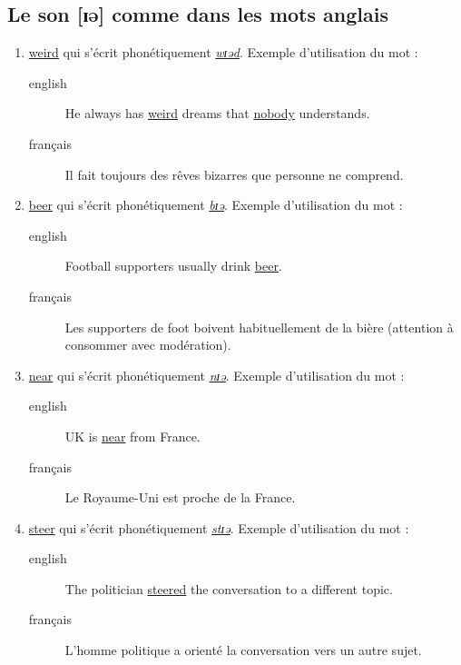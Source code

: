 \subsection{Le son [ɪə] comme dans les mots anglais}
\label{sec:org2e2326e}
\begin{enumerate}
\item \href{http://www.wordreference.com/enfr/weird}{weird} qui s'écrit phonétiquement \href{https://en.oxforddictionaries.com/definition/weird}{\emph{wɪəd}}. Exemple d'utilisation du mot :
\begin{description}
\item[{english}] \textenglish{He always has \href{https://youtu.be/fcdUXnt87ng}{weird} dreams that \href{https://youtu.be/FikYhD7bXYE}{nobody} understands.}
\item[{français}] Il fait toujours des rêves bizarres que personne ne
comprend.
\end{description}
\item \href{http://www.wordreference.com/enfr/beer}{beer} qui s'écrit phonétiquement \href{https://en.oxforddictionaries.com/definition/beer}{\emph{bɪə}}. Exemple d'utilisation du mot :
\begin{description}
\item[{english}] \textenglish{Football supporters usually drink \href{https://youtu.be/I1fsk4k-bOs}{beer}.}
\item[{français}] Les supporters de foot boivent habituellement de la
bière (attention à consommer avec modération).
\end{description}
\item \href{http://www.wordreference.com/enfr/near}{near} qui s'écrit phonétiquement \href{https://en.oxforddictionaries.com/definition/near}{\emph{nɪə}}. Exemple d'utilisation du mot : 
\begin{description}
\item[{english}] \textenglish{UK is \href{https://youtu.be/xIS9K-bNt3M}{near} from France.}
\item[{français}] Le Royaume-Uni est proche de la France.
\end{description}
\item \href{http://www.wordreference.com/enfr/steer}{steer} qui s'écrit phonétiquement \href{https://en.oxforddictionaries.com/definition/steer}{\emph{stɪə}}. Exemple d'utilisation du mot :
\begin{description}
\item[{english}] \textenglish{The politician \href{https://youtu.be/z\_vSRFODAxU}{steered} the conversation to a different
topic.}
\item[{français}] L'homme politique a orienté la conversation vers un autre sujet.
\end{description}
\end{enumerate}
